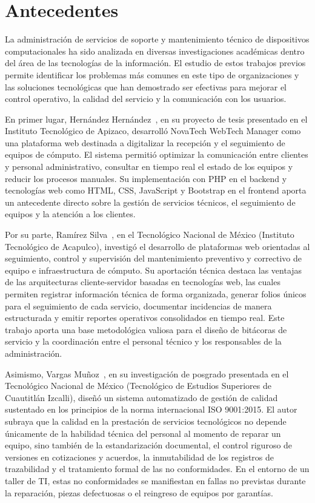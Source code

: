 \section{Antecedentes}

La administración de servicios de soporte y mantenimiento técnico de dispositivos computacionales ha sido analizada en diversas investigaciones académicas dentro del área de las tecnologías de la información. El estudio de estos trabajos previos permite identificar los problemas más comunes en este tipo de organizaciones y las soluciones tecnológicas que han demostrado ser efectivas para mejorar el control operativo, la calidad del servicio y la comunicación con los usuarios.

En primer lugar, Hernández Hernández~\cite{hernandez2025novatech}, en su proyecto de tesis presentado en el Instituto Tecnológico de Apizaco, desarrolló NovaTech WebTech Manager como una plataforma web destinada a digitalizar la recepción y el seguimiento de equipos de cómputo. El sistema permitió optimizar la comunicación entre clientes y personal administrativo, consultar en tiempo real el estado de los equipos y reducir los procesos manuales. Su implementación con PHP en el backend y tecnologías web como HTML, CSS, JavaScript y Bootstrap en el frontend aporta un antecedente directo sobre la gestión de servicios técnicos, el seguimiento de equipos y la atención a los clientes.

Por su parte, Ramírez Silva~\cite{ramirez2020desarrollo}, en el Tecnológico Nacional de México (Instituto Tecnológico de Acapulco), investigó el desarrollo de plataformas web orientadas al seguimiento, control y supervisión del mantenimiento preventivo y correctivo de equipo e infraestructura de cómputo. Su aportación técnica destaca las ventajas de las arquitecturas cliente-servidor basadas en tecnologías web, las cuales permiten registrar información técnica de forma organizada, generar folios únicos para el seguimiento de cada servicio, documentar incidencias de manera estructurada y emitir reportes operativos consolidados en tiempo real. Este trabajo aporta una base metodológica valiosa para el diseño de bitácoras de servicio y la coordinación entre el personal técnico y los responsables de la administración.

Asimismo, Vargas Muñoz~\cite{vargas2023sistema}, en su investigación de posgrado presentada en el Tecnológico Nacional de México (Tecnológico de Estudios Superiores de Cuautitlán Izcalli), diseñó un sistema automatizado de gestión de calidad sustentado en los principios de la norma internacional ISO 9001:2015. El autor subraya que la calidad en la prestación de servicios tecnológicos no depende únicamente de la habilidad técnica del personal al momento de reparar un equipo, sino también de la estandarización documental, el control riguroso de versiones en cotizaciones y acuerdos, la inmutabilidad de los registros de trazabilidad y el tratamiento formal de las no conformidades. En el entorno de un taller de TI, estas no conformidades se manifiestan en fallas no previstas durante la reparación, piezas defectuosas o el reingreso de equipos por garantías.

